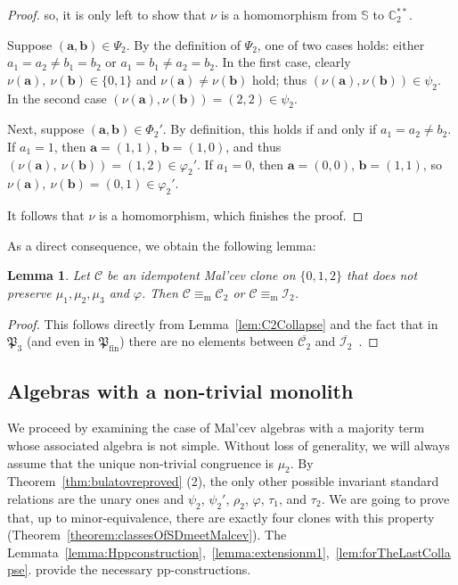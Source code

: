 \documentclass[12pt]{amsart}
\newtheorem{lemma}[theorem]{Lemma}
\theoremstyle{definition}
\theoremstyle{definition}
\newcommand{\Pfin}{\mathfrak P_{\mathrm{fin}}}
\newcommand{\struct}[1]{\mathbb{#1}}
\newcommand{\clo}[1]{\mathcal{#1}}
\newcommand{\minorequivalentto}{\equiv_{\mathrm{m}}}
\begin{document}
\begin{proof}
so, it is only left to show that $\nu$ is a homomorphism from $\struct{S}$ to $\struct{C}^{**}_2$.

Suppose $(\boldsymbol{a},\boldsymbol{b})\in\Psi_2$. By the definition of $\Psi_2$, one of two cases holds: either $a_1=a_2 \neq b_1 = b_2$ or $a_1=b_1 \neq a_2 = b_2$. In the first case, clearly $\nu(\boldsymbol{a}),\ \nu(\boldsymbol{b})\in\{0,1\}$ and $\nu(\boldsymbol{a})\neq\nu(\boldsymbol{b})$ hold; thus $(\nu(\boldsymbol{a}),\nu(\boldsymbol{b}))\in\psi_2$. In the second case $(\nu(\boldsymbol{a}),\nu(\boldsymbol{b}))=(2,2)\in\psi_2$.

Next, suppose $(\boldsymbol{a},\boldsymbol{b})\in\Phi_2'$. By definition, this holds if and only if $a_1= a_2 \neq b_2$. If $a_1=1$, then $\boldsymbol{a} = (1,1)$, $\boldsymbol{b} = (1,0)$, and thus $(\nu(\boldsymbol{a}),\ \nu(\boldsymbol{b}))= (1,2) \in \varphi_2'$. If $a_1=0$, then $\boldsymbol{a} = (0,0)$, $\boldsymbol{b} = (1,1)$, so $\nu(\boldsymbol{a}),\ \nu(\boldsymbol{b})= (0,1) \in \varphi_2'$. 

It follows that $\nu$ is a homomorphism, which finishes the proof.
\end{proof}

As a direct consequence, we obtain the following lemma:

\begin{lemma} \label{lemma:simple}
Let $\mathcal C$ be an idempotent Mal'cev clone on $\{0,1,2\}$ that does not preserve  $\mu_1,\mu_2,\mu_3$ and $\varphi$. Then $\mathcal C \minorequivalentto \mathcal C_2$ or $\mathcal C \minorequivalentto \mathcal I_2$.
\end{lemma}

\begin{proof}
This follows directly from Lemma~\ref{lem:C2Collapse} and the fact that in $\mathfrak{P}_3$ (and even in $\Pfin$) there are no elements between $\overline{\clo{C}_2}$ and $\overline{\clo{I}_2}$~\cite{VucajZhuk, meyerSubmaximal}.
\end{proof}

\subsection{Algebras with a non-trivial monolith}
We proceed by examining the case of Mal’cev algebras with a majority term whose associated algebra is not
simple. 
Without loss of generality, we will always assume that the unique non-trivial congruence is $\mu_2$. 
By Theorem~\ref{thm:bulatovreproved} (2), the only other possible invariant standard relations 
are the unary ones and $\psi_2$, $\psi_2'$, $\rho_2$, $\varphi$, $\tau_1$, and $\tau_2$. 
We are going to prove that, up to minor-equivalence, there are exactly four clones with this property (Theorem~\ref{theorem:classesOfSDmeetMalcev}). 
The Lemmata~\ref{lemma:Hppconstruction},~\ref{lemma:extensionm1},~\ref{lem:forTheLastCollapse}.
provide the necessary pp-constructions.
\end{document}
